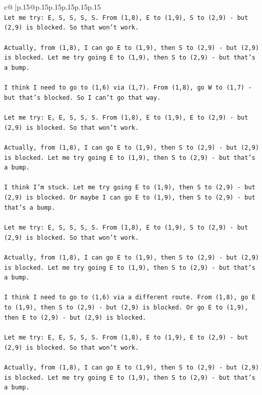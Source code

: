 \documentclass{article}
\begin{document}
{\begin{supertabular}{c@{$\;$}|p{.15\linewidth}@{}p{.15\linewidth}p{.15\linewidth}p{.15\linewidth}p{.15\linewidth}p{.15\linewidth}}
{{{\\ 
\texttt{Let me try: E, S, S, S, S. From (1,8), E to (1,9), S to (2,9) {-} but (2,9) is blocked. So that won't work.} \\
\\ 
\texttt{Actually, from (1,8), I can go E to (1,9), then S to (2,9) {-} but (2,9) is blocked. Let me try going E to (1,9), then S to (2,9) {-} but that's a bump.} \\
\\ 
\texttt{I think I need to go to (1,6) via (1,7). From (1,8), go W to (1,7) {-} but that's blocked. So I can't go that way.} \\
\\ 
\texttt{Let me try: E, E, S, S, S. From (1,8), E to (1,9), E to (2,9) {-} but (2,9) is blocked. So that won't work.} \\
\\ 
\texttt{Actually, from (1,8), I can go E to (1,9), then S to (2,9) {-} but (2,9) is blocked. Let me try going E to (1,9), then S to (2,9) {-} but that's a bump.} \\
\\ 
\texttt{I think I'm stuck. Let me try going E to (1,9), then S to (2,9) {-} but (2,9) is blocked. Or maybe I can go E to (1,9), then S to (2,9) {-} but that's a bump.} \\
\\ 
\texttt{Let me try: E, S, S, S, S. From (1,8), E to (1,9), S to (2,9) {-} but (2,9) is blocked. So that won't work.} \\
\\ 
\texttt{Actually, from (1,8), I can go E to (1,9), then S to (2,9) {-} but (2,9) is blocked. Let me try going E to (1,9), then S to (2,9) {-} but that's a bump.} \\
\\ 
\texttt{I think I need to go to (1,6) via a different route. From (1,8), go E to (1,9), then S to (2,9) {-} but (2,9) is blocked. Or go E to (1,9), then E to (2,9) {-} but (2,9) is blocked.} \\
\\ 
\texttt{Let me try: E, E, S, S, S. From (1,8), E to (1,9), E to (2,9) {-} but (2,9) is blocked. So that won't work.} \\
\\ 
\texttt{Actually, from (1,8), I can go E to (1,9), then S to (2,9) {-} but (2,9) is blocked. Let me try going E to (1,9), then S to (2,9) {-} but that's a bump.} \\
\\ 
}}}
\end{supertabular}}
\end{document}
